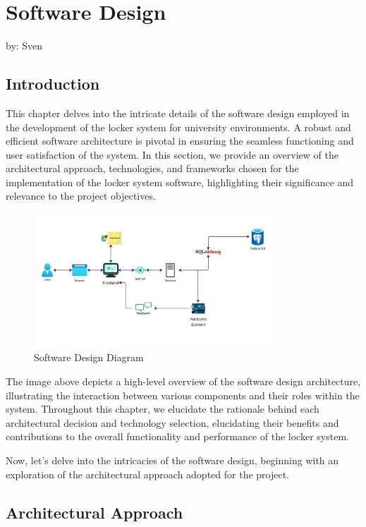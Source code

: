 \section{Software Design}
{ by: Sven}

\subsection{Introduction}

This chapter delves into the intricate details of the software design employed in the
development of the locker system for university environments. A robust and efficient
software architecture is pivotal in ensuring the seamless functioning and user satisfaction
of the system. In this section, we provide an overview of the architectural approach,
technologies, and frameworks chosen for the implementation of the locker system software,
highlighting their significance and relevance to the project objectives.

\begin{figure}[h]
    \centering
    \includegraphics[width=0.8\textwidth]{images/software_design_diagram}
    \caption{Software Design Diagram}
    \label{fig:software_design}
\end{figure}

The image above depicts a high-level overview of the software design architecture,
illustrating the interaction between various components and their roles within the system.
Throughout this chapter, we elucidate the rationale behind each architectural decision
and technology selection, elucidating their benefits and contributions to the overall
functionality and performance of the locker system.

Now, let's delve into the intricacies of the software design, beginning with an exploration
of the architectural approach adopted for the project.


\subsection{Architectural Approach}

